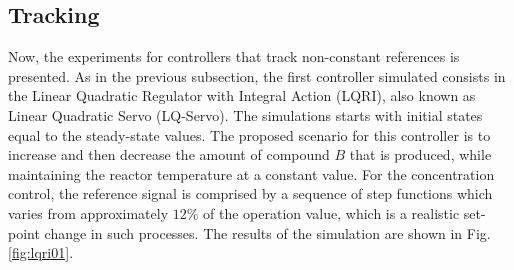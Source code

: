 \documentclass[a4paper,11pt]{book}
\numberwithin{figure}{chapter}
\numberwithin{equation}{chapter}
\numberwithin{table}{chapter}
\theoremstyle{definition}
\begin{document}
%	

\subsection{Tracking}

Now, the experiments for controllers that track non-constant references is presented. As in the previous subsection, the first controller simulated consists in the Linear Quadratic Regulator with Integral Action (LQRI), also known as Linear Quadratic Servo (LQ-Servo). The simulations starts with initial states equal to the steady-state values. The proposed scenario for this controller is to increase and then decrease the amount of compound $B$ that is produced, while maintaining the reactor temperature at a constant value. For the concentration control, the reference signal is comprised by a sequence of step functions which varies from approximately $12\%$ of the operation value, which is a realistic set-point change in such processes. The results of the simulation are shown in Fig. \ref{fig:lqri01}.
\end{document}

